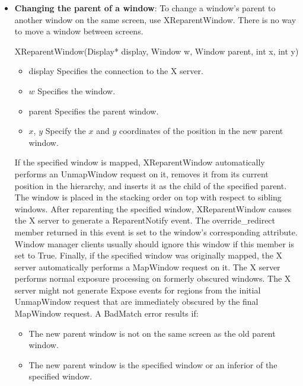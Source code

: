\documentclass{report}
\begin{document}
    \pagebreak 
    \begin{itemize}
        \item \textbf{Changing the parent of a window}: To change a window’s parent to another window on the same screen, use XReparentWindow. There is no way to move a window between screens.
            \bigbreak \noindent 
            \begin{cppcode}
            XReparentWindow(Display* display, Window w, Window parent, int x, int y)
            \end{cppcode}
            \bigbreak \noindent
            \begin{itemize}
                \item display Specifies the connection to the X server.
                \item $w$ Specifies the window.
                \item parent Specifies the parent window.
                \item $x$, $y$ Specify the $x$ and $y$ coordinates of the position in the new parent window.
            \end{itemize}
            If the specified window is mapped, XReparentWindow automatically performs an UnmapWindow request on it, removes it from its current position in the hierarchy, and inserts it as the child of the specified parent. The window is placed in the stacking order on top with respect to sibling windows.
            \bigbreak \noindent 
            After reparenting the specified window, XReparentWindow causes the X server to generate a ReparentNotify event. The override\_redirect member returned in this event is set to the window’s corresponding attribute. Window manager clients usually should ignore this window if this member is set to True. Finally, if the specified window was originally mapped, the X server automatically performs a MapWindow request on it.
            \bigbreak \noindent 
            The X server performs normal exposure processing on formerly obscured windows. The X server might not generate Expose events for regions from the initial UnmapWindow request that are immediately obscured by the final MapWindow request. A BadMatch error results if:
            \begin{itemize}
                \item The new parent window is not on the same screen as the old parent window.
                \item The new parent window is the specified window or an inferior of the specified window.

\end{itemize}
\end{itemize}
\end{document}
